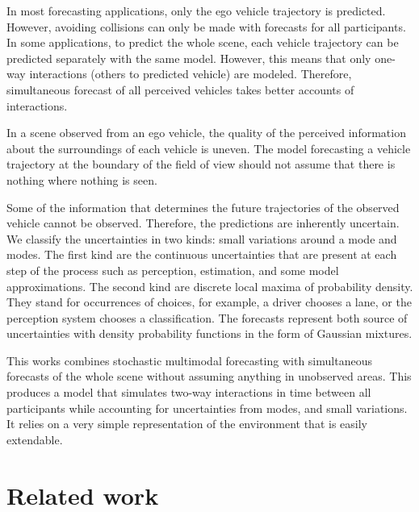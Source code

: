 \documentclass[a4paper, 10pt, conference]{ieeeconf}      %
\begin{document}
In most forecasting applications, only the ego vehicle trajectory is predicted.
However, avoiding collisions can only be made with forecasts for all participants.
In some applications, to predict the whole scene, each vehicle trajectory can be predicted separately with the same
model.
However, this means that only one-way interactions (others to predicted vehicle) are modeled.
Therefore, simultaneous forecast of all perceived vehicles takes better accounts of interactions.

In a scene observed from an ego vehicle, the quality of the perceived information about the
surroundings of each vehicle is uneven.
The model forecasting a vehicle trajectory at the boundary of the field of view should not assume
that there is nothing where nothing is seen.


Some of the information that determines the future trajectories of the observed vehicle cannot be observed.
Therefore, the predictions are inherently uncertain.
We classify the uncertainties in two kinds: small variations around a mode and modes.
The first kind are the continuous uncertainties that are present at each step of the process such as perception,
estimation, and some model approximations.
The second kind are discrete local maxima of probability density.
They stand for occurrences of choices, for example, a driver chooses a lane,
or the perception system chooses a classification.
The forecasts represent both source of uncertainties with
density probability functions in the form of Gaussian mixtures.


This works combines stochastic multimodal forecasting with simultaneous forecasts of the whole scene
without assuming anything in unobserved areas.
This produces a model that simulates two-way interactions in time between all participants
while accounting for uncertainties from modes, and small variations.
It relies on a very simple representation of the environment that is easily extendable.

\section{Related work}
\end{document}

